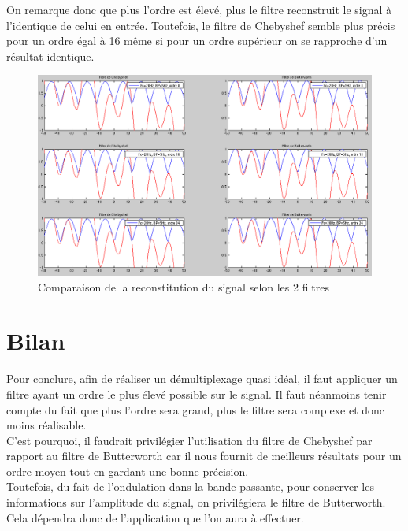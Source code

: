 \documentclass[a4paper, oneside]{report}
\begin{document}
On remarque donc que plus l'ordre est \'elev\'e, plus le filtre reconstruit le signal \`a l'identique de celui en entr\'ee. Toutefois, le filtre de Chebyshef semble plus pr\'ecis pour un ordre \'egal \`a 16 m\^eme si pour un ordre sup\'erieur on se rapproche d'un r\'esultat identique.
  
\begin{figure}[h]
\centering
\includegraphics[scale=0.4]{images/signal_butt_cheb.png}
\caption{Comparaison de la reconstitution du signal selon les 2 filtres}
\end{figure}
 	
 \chapter{Bilan}

Pour conclure, afin de r\'ealiser un d\'emultiplexage quasi id\'eal, il faut appliquer un filtre ayant un ordre le plus \'elev\'e possible sur le signal.
Il faut n\'eanmoins tenir compte du fait que plus l'ordre sera grand, plus le filtre sera complexe et donc moins r\'ealisable.\\

C'est pourquoi, il faudrait privil\'egier l'utilisation du filtre de Chebyshef par rapport au filtre de Butterworth car il nous fournit de meilleurs r\'esultats pour un ordre moyen tout en gardant une bonne pr\'ecision.\\

Toutefois, du fait de l'ondulation dans la bande-passante, pour conserver les informations sur l'amplitude du signal, on privil\'egiera le filtre de Butterworth.
Cela d\'ependra donc de l'application que l'on aura \`a effectuer.
  
\end{document}

